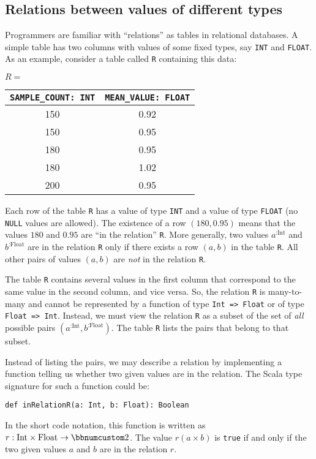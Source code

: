 \subsection{Relations between values of different types}

Programmers are familiar with \textsf{``}relations\textsf{''} as tables in relational
databases. A simple table has two columns with values of some fixed
types, say \lstinline!INT! and \lstinline!FLOAT!. As an example,
consider a table called \lstinline!R! containing this data:
\begin{center}
$R=$ %
\begin{tabular}{|c|c|}
\hline 
\lstinline!SAMPLE_COUNT: INT! & \lstinline!MEAN_VALUE: FLOAT!\tabularnewline
\hline 
\hline 
{\footnotesize{}150} & {\footnotesize{}0.92}\tabularnewline
\hline 
{\footnotesize{}150} & {\footnotesize{}0.95}\tabularnewline
\hline 
{\footnotesize{}180} & {\footnotesize{}0.95}\tabularnewline
\hline 
{\footnotesize{}180} & {\footnotesize{}1.02}\tabularnewline
\hline 
{\footnotesize{}200} & {\footnotesize{}0.95}\tabularnewline
\hline 
\end{tabular}
\par\end{center}

Each row of the table \lstinline!R! has a value of type \lstinline!INT!
and a value of type \lstinline!FLOAT! (no \lstinline!NULL! values
are allowed). The existence of a row $\left(180,0.95\right)$ means
that the values $180$ and $0.95$ are \textsf{``}in the relation\textsf{''} \lstinline!R!.
More generally, two values $a^{:\text{Int}}$ and $b^{:\text{Float}}$
are in the relation \lstinline!R! only if there exists a row $\left(a,b\right)$
in the table \lstinline!R!. All other pairs of values $\left(a,b\right)$
are \emph{not} in the relation \lstinline!R!. 

The table \lstinline!R! contains several values in the first column
that correspond to the same value in the second column, and vice versa.
So, the relation \lstinline!R! is many-to-many and cannot be represented
by a function of type \lstinline!Int => Float! or of type \lstinline!Float => Int!.
Instead, we must view the relation \lstinline!R! as a subset of the
set of \emph{all} possible pairs $(a^{:\text{Int}},b^{:\text{Float}})$.
The table \lstinline!R! lists the pairs that belong to that subset.

Instead of listing the pairs, we may describe a relation by implementing
a function telling us whether two given values are in the relation.
The Scala type signature for such a function could be:
\begin{lstlisting}
def inRelationR(a: Int, b: Float): Boolean
\end{lstlisting}
In the short code notation, this function is written as $r:\text{Int}\times\text{Float}\rightarrow\bbnum 2$.
The value $r(a\times b)$ is \lstinline!true! if and only if the
two given values $a$ and $b$ are in the relation $r$.

